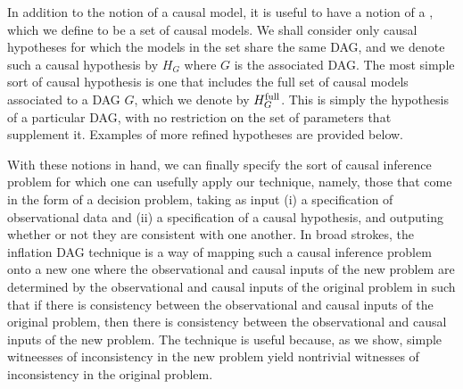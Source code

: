 In addition to the notion of a causal model, it is useful to have a notion of a , which we define to be a set of causal models.  We shall consider only causal hypotheses for which the models in the set share the same DAG, and we denote such a causal hypothesis by $H_G$ where $G$ is the associated DAG.
The most simple sort of causal hypothesis is one that includes the full set of causal models associated to a DAG $G$, which we denote by $H_G^{\rm full}$.  This is simply the hypothesis of a particular DAG, with no restriction on the set of parameters that supplement it.   Examples of more refined hypotheses are provided below.



With these notions in hand, we can finally specify the sort of causal inference problem for which one can usefully apply our technique, namely, those that come in the form of a decision problem, taking as input (i) a specification of observational data and (ii) a specification of a causal hypothesis, and outputing whether or not they are consistent with one another.   In broad strokes, the inflation DAG technique is a way of mapping such a causal inference problem onto a new one where the observational and causal inputs of the new problem are determined by the observational and causal inputs of the original problem in such that if there is consistency between the observational and causal inputs of the original problem, then there is consistency between the observational and causal inputs of the new problem.  The technique is useful because, as we show, simple witneesses of inconsistency in the new problem yield nontrivial witnesses of inconsistency in the original problem. 

